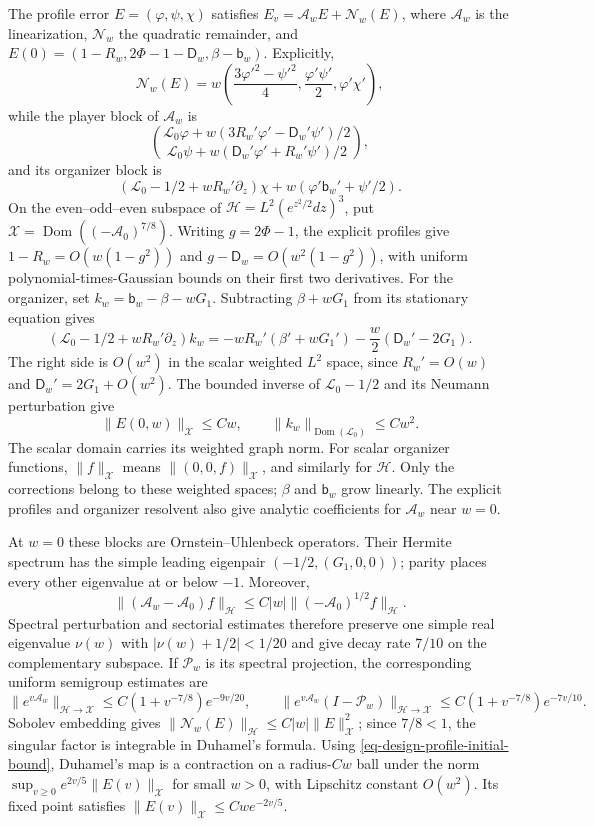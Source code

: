 \documentclass[mnsc]{informs3}
\begin{document}
\begin{APPENDICES}
{The profile error $E=(\varphi,\psi,\chi)$ satisfies
$E_v=\mathcal A_wE+\mathscr N_w(E)$, where $\mathcal A_w$ is the
linearization, $\mathscr N_w$ the quadratic remainder, and
$E(0)=(1-R_w,2\Phi-1-\mathsf D_w,\beta-\mathsf b_w)$.
Explicitly,
\[
\mathscr N_w(E)=w\left(
\frac{3\varphi'^2-\psi'^2}{4},\frac{\varphi'\psi'}2,\varphi'\chi'
\right),
\]
while the player block of $\mathcal A_w$ is
\[
\binom{\mathscr L_0\varphi+
w(3R_w'\varphi'-\mathsf D_w'\psi')/2}
{\mathscr L_0\psi+w(\mathsf D_w'\varphi'+R_w'\psi')/2},
\]
and its organizer block is
\[
(\mathscr L_0-1/2+wR_w'\partial_z)\chi
+w(\varphi'\mathsf b_w'+\psi'/2).
\]
On the even--odd--even subspace of
$\mathscr H=L^2(e^{z^2/2}dz)^3$, put $\mathscr X=\operatorname{Dom}((-\mathcal A_0)^{7/8})$.
Writing $g=2\Phi-1$, the explicit profiles give
$1-R_w=O(w(1-g^2))$ and $g-\mathsf D_w=O(w^2(1-g^2))$,
with uniform polynomial-times-Gaussian bounds on their first two derivatives.
For the organizer, set $k_w=\mathsf b_w-\beta-wG_1$.
Subtracting $\beta+wG_1$ from its stationary equation gives
\[
(\mathscr L_0-1/2+wR_w'\partial_z)k_w
=-wR_w'(\beta'+wG_1')-\frac w2(\mathsf D_w'-2G_1).
\]
The right side is $O(w^2)$ in the scalar weighted $L^2$ space, since
$R_w'=O(w)$ and $\mathsf D_w'=2G_1+O(w^2)$.
The bounded inverse of $\mathscr L_0-1/2$ and its Neumann perturbation give
\begin{equation}\label{eq-design-profile-initial-bound}
\|E(0,w)\|_{\mathscr X}\leq Cw,\qquad
\|k_w\|_{\operatorname{Dom}(\mathscr L_0)}\leq Cw^2.
\end{equation}
The scalar domain carries its weighted graph norm.
For scalar organizer functions, $\|f\|_{\mathscr X}$ means
$\|(0,0,f)\|_{\mathscr X}$, and similarly for $\mathscr H$.
Only the corrections belong to these weighted spaces; $\beta$ and
$\mathsf b_w$ grow linearly. The explicit profiles and organizer resolvent
also give analytic coefficients for $\mathcal A_w$ near $w=0$.

At $w=0$ these blocks are Ornstein--Uhlenbeck operators. Their Hermite
spectrum has the simple leading eigenpair
$(-1/2,(G_1,0,0))$; parity places every other eigenvalue at or below
$-1$. Moreover,
\[
\|(\mathcal A_w-\mathcal A_0)f\|_{\mathscr H}
\leq C|w|\|(-\mathcal A_0)^{1/2}f\|_{\mathscr H}.
\]
Spectral perturbation \citep[][Chapter~VII, Sections~1--2]{Kato1980}
and sectorial estimates \citep[][Proposition~3.2.2 and Chapter~5]{LorenziEtAl2005}
therefore preserve one simple real eigenvalue $\nu(w)$ with
$|\nu(w)+1/2|<1/20$ and give decay rate $7/10$ on the complementary
subspace. If $\mathscr P_w$ is its spectral projection, the corresponding
uniform semigroup estimates are
\[
\|e^{v\mathcal A_w}\|_{\mathscr H\to\mathscr X}
\leq C(1+v^{-7/8})e^{-9v/20},\qquad
\|e^{v\mathcal A_w}(I-\mathscr P_w)\|_{\mathscr H\to\mathscr X}
\leq C(1+v^{-7/8})e^{-7v/10}.
\]
Sobolev embedding gives $\|\mathscr N_w(E)\|_{\mathscr H}\leq C|w|\|E\|_{\mathscr X}^2$;
since $7/8<1$, the singular factor is integrable in Duhamel's formula.
Using \eqref{eq-design-profile-initial-bound}, Duhamel's map is a contraction
on a radius-$Cw$ ball under the norm $\sup_{v\geq0}e^{2v/5}\|E(v)\|_{\mathscr X}$
for small $w>0$, with Lipschitz constant $O(w^2)$. Its fixed point satisfies
$\|E(v)\|_{\mathscr X}\leq Cwe^{-2v/5}$.

}
\end{APPENDICES}
\end{document}
